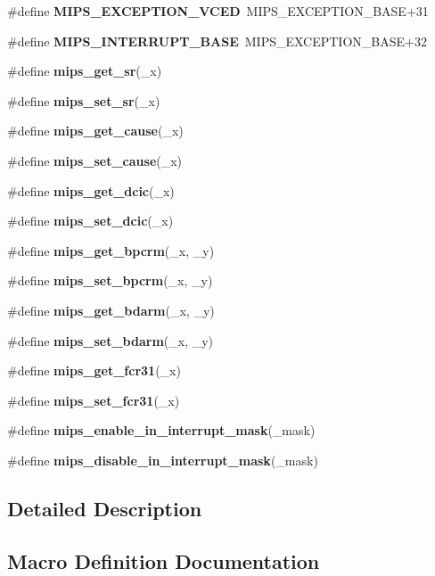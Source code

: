 \begin{DoxyCompactItemize}
\#define {\bfseries M\+I\+P\+S\+\_\+\+E\+X\+C\+E\+P\+T\+I\+O\+N\+\_\+\+V\+C\+ED}~M\+I\+P\+S\+\_\+\+E\+X\+C\+E\+P\+T\+I\+O\+N\+\_\+\+B\+A\+SE+31
\item 
\mbox{\label{group__RTEMSScoreCPUMIPSBuild_ga60b4b101568e946d6d091ab6b153c2e2}} 
\#define {\bfseries M\+I\+P\+S\+\_\+\+I\+N\+T\+E\+R\+R\+U\+P\+T\+\_\+\+B\+A\+SE}~M\+I\+P\+S\+\_\+\+E\+X\+C\+E\+P\+T\+I\+O\+N\+\_\+\+B\+A\+SE+32
\item 
\#define {\bfseries mips\+\_\+get\+\_\+sr}(\+\_\+x)
\item 
\#define {\bfseries mips\+\_\+set\+\_\+sr}(\+\_\+x)
\item 
\#define {\bfseries mips\+\_\+get\+\_\+cause}(\+\_\+x)
\item 
\#define {\bfseries mips\+\_\+set\+\_\+cause}(\+\_\+x)
\item 
\#define {\bfseries mips\+\_\+get\+\_\+dcic}(\+\_\+x)
\item 
\#define {\bfseries mips\+\_\+set\+\_\+dcic}(\+\_\+x)
\item 
\#define {\bfseries mips\+\_\+get\+\_\+bpcrm}(\+\_\+x,  \+\_\+y)
\item 
\#define {\bfseries mips\+\_\+set\+\_\+bpcrm}(\+\_\+x,  \+\_\+y)
\item 
\#define {\bfseries mips\+\_\+get\+\_\+bdarm}(\+\_\+x,  \+\_\+y)
\item 
\#define {\bfseries mips\+\_\+set\+\_\+bdarm}(\+\_\+x,  \+\_\+y)
\item 
\#define {\bfseries mips\+\_\+get\+\_\+fcr31}(\+\_\+x)
\item 
\#define {\bfseries mips\+\_\+set\+\_\+fcr31}(\+\_\+x)
\item 
\#define {\bfseries mips\+\_\+enable\+\_\+in\+\_\+interrupt\+\_\+mask}(\+\_\+mask)
\item 
\#define {\bfseries mips\+\_\+disable\+\_\+in\+\_\+interrupt\+\_\+mask}(\+\_\+mask)
\end{DoxyCompactItemize}


\subsection{Detailed Description}


\subsection{Macro Definition Documentation}
\mbox{\label{group__RTEMSScoreCPUMIPSBuild_ga48913e73f5cbea8b34e6b5d750dddd83}} 
